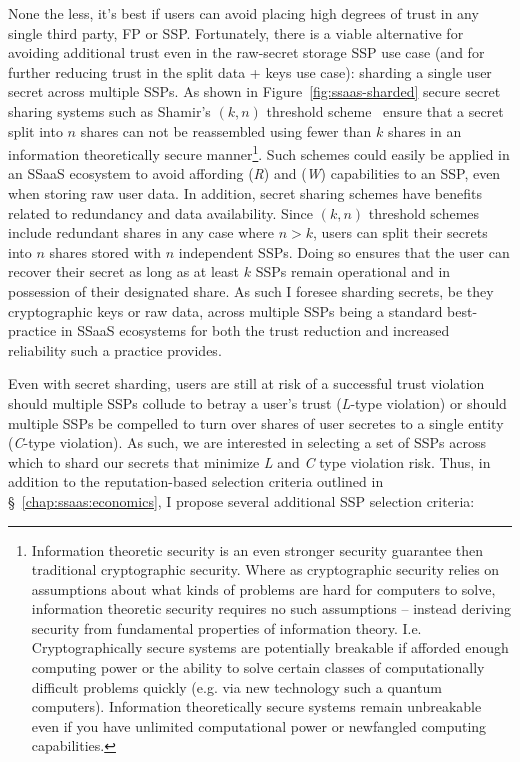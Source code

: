 None the less, it's best if users can avoid placing high degrees of
trust in any single third party, FP or SSP. Fortunately, there is a
viable alternative for avoiding additional trust even in the
raw-secret storage SSP use case (and for further reducing trust in the
split data + keys use case): sharding a single user secret across
multiple SSPs. As shown in Figure~\ref{fig:ssaas-sharded} secure
secret sharing systems such as Shamir's $(k, n)$ threshold
scheme~\cite{shamir1979} ensure that a secret split into $n$ shares
can not be reassembled using fewer than $k$ shares in an information
theoretically secure manner\footnote{Information theoretic security is
  an even stronger security guarantee then traditional cryptographic
  security. Where as cryptographic security relies on assumptions
  about what kinds of problems are hard for computers to solve,
  information theoretic security requires no such assumptions --
  instead deriving security from fundamental properties of information
  theory. I.e. Cryptographically secure systems are potentially
  breakable if afforded enough computing power or the ability to solve
  certain classes of computationally difficult problems quickly
  (e.g. via new technology such a quantum computers). Information
  theoretically secure systems remain unbreakable even if you have
  unlimited computational power or newfangled computing
  capabilities.}. Such schemes could easily be applied in an SSaaS
ecosystem to avoid affording (\emph{R}) and (\emph{W}) capabilities to
an SSP, even when storing raw user data. In addition, secret sharing
schemes have benefits related to redundancy and data
availability. Since $(k, n)$ threshold schemes include redundant
shares in any case where $n > k$, users can split their secrets into
$n$ shares stored with $n$ independent SSPs. Doing so ensures that the
user can recover their secret as long as at least $k$ SSPs remain
operational and in possession of their designated share. As such I
foresee sharding secrets, be they cryptographic keys or raw data,
across multiple SSPs being a standard best-practice in SSaaS
ecosystems for both the trust reduction and increased reliability such
a practice provides.

Even with secret sharding, users are still at risk of a successful
trust violation should multiple SSPs collude to betray a user's trust
(\emph{L}-type violation) or should multiple SSPs be compelled to turn
over shares of user secretes to a single entity (\emph{C}-type
violation). As such, we are interested in selecting a set of SSPs
across which to shard our secrets that minimize \emph{L} and \emph{C}
type violation risk. Thus, in addition to the reputation-based
selection criteria outlined in \S~\ref{chap:ssaas:economics}, I
propose several additional SSP selection criteria:

